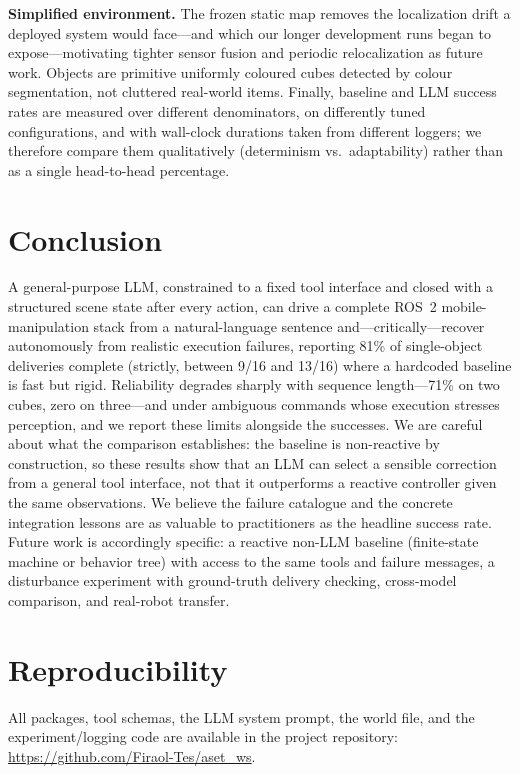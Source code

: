 \documentclass[conference]{IEEEtran}
\begin{document}
\textbf{Simplified environment.} The frozen static map removes the
localization drift a deployed system would face---and which our longer
development runs began to expose---motivating tighter sensor fusion and
periodic relocalization as future work. Objects are primitive uniformly
coloured cubes detected by colour segmentation, not cluttered real-world
items. Finally, baseline and LLM success rates are measured over different
denominators, on differently tuned configurations, and with wall-clock
durations taken from different loggers; we therefore compare them
qualitatively (determinism vs.\ adaptability) rather than as a single
head-to-head percentage.

\section{Conclusion}

A general-purpose LLM, constrained to a fixed tool interface and closed
with a structured scene state after every action, can drive a complete
ROS~2 mobile-manipulation stack from a natural-language sentence
and---critically---recover autonomously from realistic execution failures,
reporting 81\% of single-object deliveries complete (strictly, between 9/16
and 13/16) where a hardcoded baseline is fast but rigid. Reliability
degrades sharply with sequence length---71\% on two cubes, zero on
three---and under ambiguous commands whose execution stresses perception,
and we report these limits alongside the successes. We are careful about
what the comparison establishes: the baseline is non-reactive by
construction, so these results show that an LLM can select a sensible
correction from a general tool interface, not that it outperforms a
reactive controller given the same observations. We believe the failure
catalogue and the concrete integration lessons are as valuable to
practitioners as the headline success rate. Future work is accordingly
specific: a reactive non-LLM baseline (finite-state machine or behavior
tree) with access to the same tools and failure messages, a disturbance
experiment with ground-truth delivery checking, cross-model comparison,
and real-robot transfer.

\section*{Reproducibility}
All packages, tool schemas, the LLM system prompt, the world file, and the
experiment/logging code are available in the project repository:
\url{https://github.com/Firaol-Tes/aset_ws}.
\end{document}
